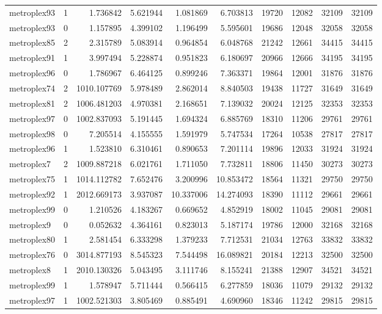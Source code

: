 \begin{longtable}{|l|r|r|r|r|r|r|r|r|r|}
metroplex93 & 1 & 1.736842 & 5.621944 & 1.081869 & 6.703813 & 19720 & 12082 & 32109 & 32109 \\
metroplex93 & 0 & 1.157895 & 4.399102 & 1.196499 & 5.595601 & 19686 & 12048 & 32058 & 32058 \\
metroplex85 & 2 & 2.315789 & 5.083914 & 0.964854 & 6.048768 & 21242 & 12661 & 34415 & 34415 \\
metroplex91 & 1 & 3.997494 & 5.228874 & 0.951823 & 6.180697 & 20966 & 12666 & 34195 & 34195 \\
metroplex96 & 0 & 1.786967 & 6.464125 & 0.899246 & 7.363371 & 19864 & 12001 & 31876 & 31876 \\
metroplex74 & 2 & 1010.107769 & 5.978489 & 2.862014 & 8.840503 & 19438 & 11727 & 31649 & 31649 \\
metroplex81 & 2 & 1006.481203 & 4.970381 & 2.168651 & 7.139032 & 20024 & 12125 & 32353 & 32353 \\
metroplex97 & 0 & 1002.837093 & 5.191445 & 1.694324 & 6.885769 & 18310 & 11206 & 29761 & 29761 \\
metroplex98 & 0 & 7.205514 & 4.155555 & 1.591979 & 5.747534 & 17264 & 10538 & 27817 & 27817 \\
metroplex96 & 1 & 1.523810 & 6.310461 & 0.890653 & 7.201114 & 19896 & 12033 & 31924 & 31924 \\
metroplex7 & 2 & 1009.887218 & 6.021761 & 1.711050 & 7.732811 & 18806 & 11450 & 30273 & 30273 \\
metroplex75 & 1 & 1014.112782 & 7.652476 & 3.200996 & 10.853472 & 18564 & 11321 & 29750 & 29750 \\
metroplex92 & 1 & 2012.669173 & 3.937087 & 10.337006 & 14.274093 & 18390 & 11112 & 29661 & 29661 \\
metroplex99 & 0 & 1.210526 & 4.183267 & 0.669652 & 4.852919 & 18002 & 11045 & 29081 & 29081 \\
metroplex9 & 0 & 0.052632 & 4.364161 & 0.823013 & 5.187174 & 19786 & 12000 & 32168 & 32168 \\
metroplex80 & 1 & 2.581454 & 6.333298 & 1.379233 & 7.712531 & 21034 & 12763 & 33832 & 33832 \\
metroplex76 & 0 & 3014.877193 & 8.545323 & 7.544498 & 16.089821 & 20184 & 12213 & 32500 & 32500 \\
metroplex8 & 1 & 2010.130326 & 5.043495 & 3.111746 & 8.155241 & 21388 & 12907 & 34521 & 34521 \\
metroplex99 & 1 & 1.578947 & 5.711444 & 0.566415 & 6.277859 & 18036 & 11079 & 29132 & 29132 \\
metroplex97 & 1 & 1002.521303 & 3.805469 & 0.885491 & 4.690960 & 18346 & 11242 & 29815 & 29815 \\

\end{longtable}
